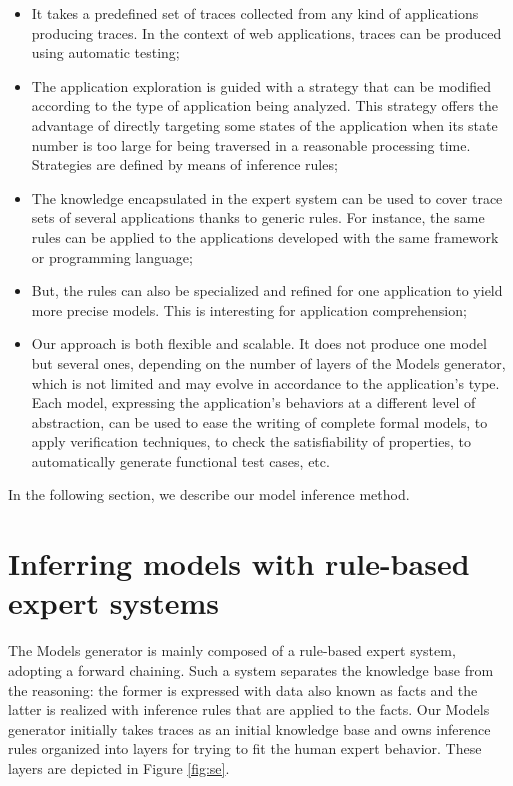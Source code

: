 \begin{itemize}
\item It takes a predefined set of traces collected from any kind
of applications producing traces. In the context of web
applications, traces can be produced using automatic testing;

\item The application exploration is guided with a strategy that
can be modified according to the type of application being
analyzed. This strategy offers the advantage of directly targeting
some states of the application when its state number is too large
for being traversed in a reasonable processing time. Strategies
are defined by means of inference rules;

\item The knowledge encapsulated in the expert system can be used
to cover trace sets of several applications thanks to generic
rules. For instance, the same rules can be applied to the
applications developed with the same framework or programming
language;

\item But, the rules can also be specialized and refined for one
application to yield more precise models. This is interesting for
application comprehension;

\item Our approach is both flexible and scalable. It does not
produce one model but several ones, depending on the number of
layers of the Models generator, which is not limited and may
evolve in accordance to the application's type. Each model,
expressing the application's behaviors at a different level of
abstraction, can be used to ease the writing of complete formal
models, to apply verification techniques, to check the
satisfiability of properties, to automatically generate
functional test cases, etc.
\end{itemize}

In the following section, we describe our model inference method.


\section{Inferring models with rule-based expert systems}
\label{sec:modelinf:webapps:contrib}

The Models generator is mainly composed of a rule-based expert
system, adopting a forward chaining. Such a system separates the
knowledge base from the reasoning: the former is expressed with
data also known as facts and the latter is realized with
inference rules that are applied to the facts. Our Models
generator initially takes traces as an initial knowledge base and
owns inference rules organized into layers for trying to fit the
human expert behavior. These layers are depicted in Figure
\ref{fig:se}.

